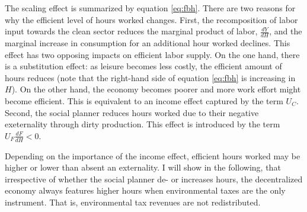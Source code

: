 The scaling effect is summarized by equation \ref{eq:fbh}.
There are two reasons for why the efficient level of hours worked changes. 
First, the recomposition of labor input towards the  clean sector reduces the marginal product of labor, $\frac{dY}{dH}$, and the marginal increase in consumption for an additional hour worked declines.  This effect has two opposing impacts on efficient labor supply. On the one hand, there is a substitution effect: as leisure becomes less costly, the efficient amount of hours reduces (note that the right-hand side of equation \ref{eq:fbh} is increasing in $H$). On the other hand, the economy becomes poorer and more work effort might become efficient. This is equivalent to an income effect captured by the term $U_C$. 
Second, the social planner reduces hours worked due to their negative exeternality through dirty production. This effect is introduced by the term $U_F\frac{dF}{dH}<0$. 

Depending on the importance of the income effect, efficient hours worked may be higher or lower than  absent an externality. %
I will show in the following, that irrespective of whether the social planner de- or increases hours, the decentralized economy always features higher hours when environmental taxes are the only instrument. That is, environmental tax revenues are not redistributed. 

\begin{comment}
\hrule
One can show that the total effect of a drop in the dirty labor share on hours worked is positive, i.e. $\frac{dh_{FB}}{ds}>0$, if $\theta<\frac{\varepsilon}{\varepsilon-s}$. If the income effect dominates, the social planner increases hours worked as the economy becomes less productive. 
Under the value for $\theta$ suggested by \cite{Boppart2019LaborPerspectiveb}, the efficient scale effect is to increase hours worked. When, however, the substitution effect outweighs or dominates the income effect - as commonly assumed in the public finance literature \citep{Heathcote2017OptimalFramework, LansBovenberg1994EnvironmentalTaxation, LansBovenberg1996OptimalAnalyses} \tr{CHECK this}!.
Nevertheless, the level of hours worked exceeds the efficient level irrespective of $\theta$ when no lump-sum transfers are available. 
When the efficient level of hours increases, though, the dirty labor share reduces even more to outweigh the increase in the externality.

content...
\end{comment}
